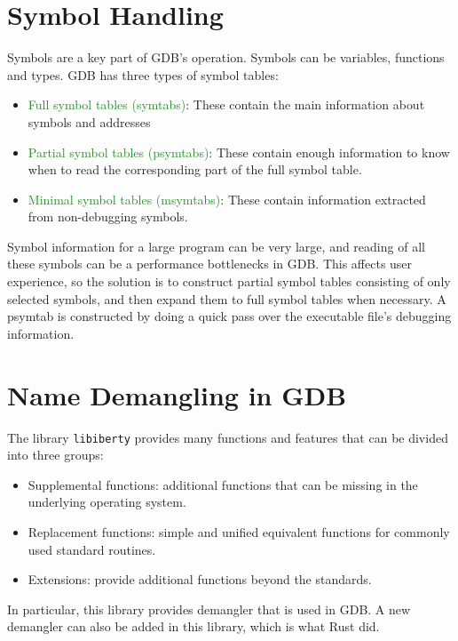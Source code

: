 \section{Symbol Handling}
Symbols are a key part of GDB's operation. Symbols can be variables, functions and
types. GDB has three types of symbol tables:
\begin{itemize}
    \item \textcolor{ForestGreen}{Full symbol tables (symtabs)}: These contain the main information
        about symbols and addresses
    \item \textcolor{ForestGreen} {Partial symbol tables (psymtabs)}: These contain enough information to
        know when to read the corresponding part of the full symbol table.
    \item \textcolor{ForestGreen}{Minimal symbol tables (msymtabs)}: These
        contain information extracted from non-debugging symbols.
\end{itemize}

Symbol information for a large program can be very large, and reading of all
these symbols can be a performance bottlenecks in GDB. This affects user
experience, so the solution is to construct partial symbol tables consisting of
only selected symbols, and then expand them to full symbol tables when
necessary.
A psymtab is constructed by doing a quick pass over the executable file's
debugging information.

\section{Name Demangling in GDB}
The library \verb|libiberty| provides many functions and features that can be
divided into three groups:
\begin{itemize}
    \item Supplemental functions: additional functions that can be missing in
        the underlying operating system.
    \item Replacement functions: simple and unified equivalent functions for
        commonly used standard routines.
    \item Extensions: provide additional functions beyond the standards.
\end{itemize}

In particular, this library provides \CPPS demangler that is used in GDB. A new
demangler can also be added in this library, which is what Rust did.
